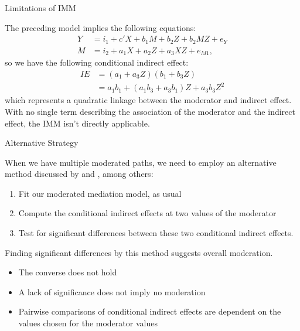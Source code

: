 \documentclass{beamer}
\newcommand{\va}[0]{\vspace{12pt}}
\newcommand{\vb}[0]{\vspace{6pt}}
\begin{document}
\begin{frame}{Limitations of IMM}
  
  The preceding model implies the following equations:
  \begin{align}
    Y &= i_1 + c'X + b_1M + b_2Z + b_2MZ + e_{Y}\\
    M &= i_2 + a_1X + a_2Z + a_3XZ + e_{M1},
  \end{align}
  so we have the following conditional indirect effect:
  \begin{align*}
    IE &= \left(a_1 + a_3Z\right) \left(b_1 + b_3Z \right)\\
    &= a_1b_1 + \left(a_1b_3 + a_3b_1\right)Z + a_3b_3Z^2
  \end{align*}
  which represents a quadratic linkage between the moderator and
  indirect effect.\\ 
  \va 
  With no single term describing the
  association of the moderator and the indirect effect, the
  \citet{hayes:2015} IMM isn't directly applicable.
  
\end{frame}
  

\begin{frame}{Alternative Strategy}
  
  When we have multiple moderated paths, we need to employ an
  alternative method discussed by \citet{edwardsLambert:2007} and
  \citet{wangPreacher:2015}, among others: 
  \vb
  \begin{enumerate}
  \item Fit our moderated mediation model, as usual
  \item Compute the conditional indirect effects at two values of the
    moderator
  \item Test for significant differences between these two conditional
    indirect effects.
  \end{enumerate}
  \vb
  Finding significant differences by this method suggests overall moderation.
  \begin{itemize}
    \item The converse does not hold
    \item A lack of significance does not imply no moderation
    \item Pairwise comparisons of conditional indirect effects are
      dependent on the values chosen for the moderator values
  \end{itemize}
  
\end{frame}
\end{document}

